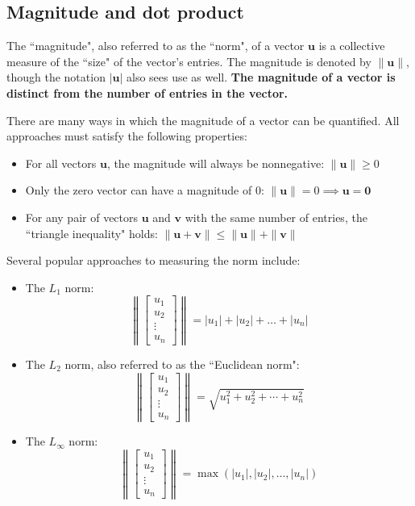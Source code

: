 \documentclass{article}
\begin{document}
\subsection*{Magnitude and dot product}

The ``magnitude", also referred to as the ``norm", of a vector \(\mathbf{u}\) is a collective measure of the ``size" of the vector's entries. The magnitude is denoted by \(\|\mathbf{u}\|\), though the notation \(|\mathbf{u}|\) also sees use as well. {\bf The magnitude of a vector is distinct from the number of entries in the vector.} 

There are many ways in which the magnitude of a vector can be quantified. All approaches must satisfy the following properties:
\begin{itemize}
\item For all vectors \(\mathbf{u}\), the magnitude will always be nonnegative: \(\|\mathbf{u}\| \geq 0\)
\item Only the zero vector can have a magnitude of \(0\): \(\|\mathbf{u}\| = 0 \implies \mathbf{u} = \mathbf{0}\)
\item For any pair of vectors \(\mathbf{u}\) and \(\mathbf{v}\) with the same number of entries, the ``triangle inequality" holds: \(\|\mathbf{u} + \mathbf{v}\| \leq \|\mathbf{u}\| + \|\mathbf{v}\|\)
\end{itemize}

Several popular approaches to measuring the norm include:
\begin{itemize}
\item The \(L_1\) norm:
\[\left\|\begin{bmatrix} u_1 \\ u_2 \\ \vdots \\ u_n \end{bmatrix}\right\| = |u_1| + |u_2| + \dots + |u_n|\]
\item The \(L_2\) norm, also referred to as the ``Euclidean norm": 
\[\left\|\begin{bmatrix} u_1 \\ u_2 \\ \vdots \\ u_n \end{bmatrix}\right\| = \sqrt{u_1^2 + u_2^2 + \cdots + u_n^2}\]
\item The \(L_{\infty}\) norm:
\[\left\|\begin{bmatrix} u_1 \\ u_2 \\ \vdots \\ u_n \end{bmatrix}\right\| = \max(|u_1|, |u_2|, \dots, |u_n|)\]
\end{itemize}
\end{document}
